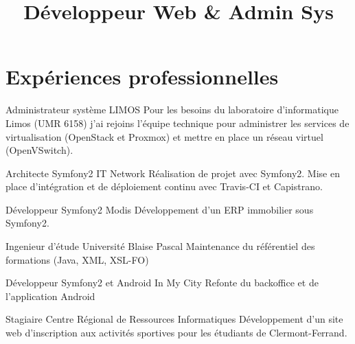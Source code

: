 \documentclass[11pt,a4paper]{moderncv}
\title{Développeur Web \& Admin Sys}                               %
\begin{document}
    \maketitle
    \section{Expériences professionnelles}
        {Administrateur système}
        {LIMOS}
        {}
        {}
        {
          \justify
          Pour les besoins du laboratoire d'informatique Limos (UMR 6158) j'ai rejoins l'équipe technique \newline{}
          pour administrer les services de virtualisation (OpenStack et Proxmox) et mettre en place un \newline{}
          réseau virtuel (OpenVSwitch).
        }

        {Architecte Symfony2}
        {IT Network}
        {}
        {}
        {
          \justify
          Réalisation de projet avec Symfony2. Mise en place d'intégration et de déploiement continu avec\newline{}
          Travis-CI et Capistrano.
        }

        {
          Développeur Symfony2
        }
        {Modis}
        {}
        {}
        {Développement d'un ERP immobilier sous Symfony2.}

        {Ingenieur d'étude}
        {Université Blaise Pascal}
        {}
        {}
        {Maintenance du référentiel des formations (Java, XML, XSL-FO)}

        {Développeur Symfony2 et Android}
        {In My City}
        {}
        {}
        {Refonte du backoffice et de l'application Android}

        {Stagiaire}
        {Centre Régional de Ressources Informatiques}
        {}
        {}
        {
          Développement d'un site web d'inscription aux activités sportives pour les étudiants \newline{}
          de Clermont-Ferrand. 
        }
\end{document}

